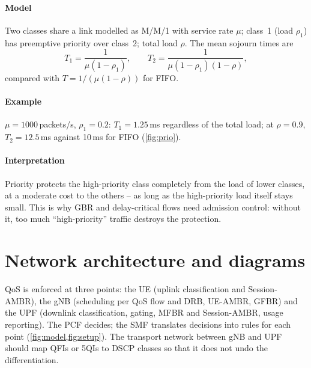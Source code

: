 \documentclass[11pt,a4paper]{article}
\begin{document}
\paragraph{Model} Two classes share a link modelled as M/M/1 with service rate $\mu$; class~1 (load $\rho_1$) has preemptive priority over
class~2; total load $\rho$. The mean sojourn times are
\begin{equation}\label{eq:prio}
  T_1 = \frac{1}{\mu(1-\rho_1)}, \qquad
  T_2 = \frac{1}{\mu(1-\rho_1)(1-\rho)},
\end{equation}
compared with $T = 1/(\mu(1-\rho))$ for FIFO.
\paragraph{Example} $\mu = 1000$\,packets/s, $\rho_1 = 0.2$: $T_1 = 1.25$\,ms regardless of the total load; at $\rho = 0.9$, $T_2 = 12.5$\,ms against 10\,ms for FIFO
(\cref{fig:prio}).
\paragraph{Interpretation} Priority protects the high-priority class completely from the load of lower classes, at a moderate cost to the others --
as long as the high-priority load itself stays small. This is why GBR and delay-critical flows need admission control: without it, too much
``high-priority'' traffic destroys the protection.

\begin{acnfigure}
  \caption{Mean delay with preemptive priority and with FIFO (\cref{eq:prio}, $\rho_1 = 0.2$, $\mu = 1000$\,s$^{-1}$).}
  \label{fig:prio}
\end{acnfigure}

\section{Network architecture and diagrams}
QoS is enforced at three points: the UE (uplink classification and Session-AMBR), the gNB (scheduling per QoS flow and DRB, UE-AMBR, GFBR) and the
UPF (downlink classification, gating, MFBR and Session-AMBR, usage reporting). The PCF decides; the SMF translates decisions into rules for each
point (\cref{fig:model,fig:setup}). The transport network between gNB and UPF should map QFIs or 5QIs to DSCP classes so that it does not undo the
differentiation.

\end{document}
